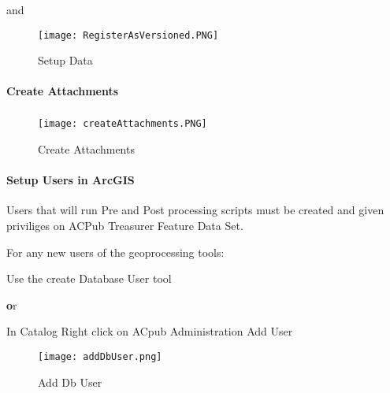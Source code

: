  and
 \vspace{.2in}

 \vspace{.2in}

 \begin{figure}[h!]
 \centering
     \texttt{[image: RegisterAsVersioned.PNG]}
 \caption{Setup Data}
 \end{figure}
 \clearpage
 \paragraph[Create Attachments]{\Large Create Attachments\texorpdfstring{\\}{}}

 \vspace{.3in}

 \subparagraph*{}
 \begin{figure}[h!]
 \centering
     \texttt{[image: createAttachments.PNG]}
 \caption{Create Attachments}
 \end{figure}
 \clearpage
 \paragraph[Setup Users in ArcGIS]{\Large Setup Users in ArcGIS\texorpdfstring{\\}{}}

 Users that will run Pre and Post processing scripts must be created and given priviliges on ACPub Treasurer Feature Data Set.
 \vspace{.35in}

 \noindent For any new users of the geoprocessing tools:

 \vspace{.15in}

 Use the create Database User tool
  \vspace{.15in}

 {\textbf or}

 \vspace{.15in}

In Catalog \rtArrow Right click on ACpub \rtArrow Administration \rtArrow Add User

 \vspace{.35in}

 \begin{figure}[h!]
 \centering
     \texttt{[image: addDbUser.png]}
 \caption{Add Db User}
 \end{figure}
 \clearpage
